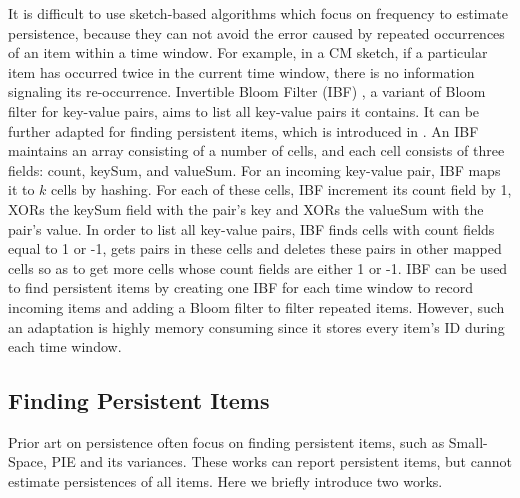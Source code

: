 It is difficult to use sketch-based algorithms which focus on frequency to estimate persistence, because they can not avoid the error caused by repeated occurrences of an item within a time window.
For example, in a CM sketch, if a particular item has occurred twice in the current time window, there is no information signaling its re-occurrence.
Invertible Bloom Filter (IBF) \cite{IBF}, a variant of Bloom filter for key-value pairs, aims to list all key-value pairs it contains.
It can be further adapted for finding persistent items, which is introduced in \cite{pie}.
An IBF maintains an array consisting of a number of cells, and each cell consists of three fields: count, keySum, and valueSum.
For an incoming key-value pair, IBF maps it to $k$ cells by hashing.
For each of these cells, IBF increment its count field by 1, XORs the keySum field with the pair's key and XORs the valueSum with the pair's value.
In order to list all key-value pairs, IBF finds cells with count fields equal to 1 or -1, gets pairs in these cells and deletes these pairs in other mapped cells so as to get more cells whose count fields are either 1 or -1.
IBF can be used to find persistent items by creating one IBF for each time window to record incoming items and adding a Bloom filter to filter repeated items.
However, such an adaptation is highly memory consuming since it stores every item's ID during each time window.





\presub
\subsection{Finding Persistent Items}
\postsub
\label{subsec:relate:persis}

Prior art on persistence often focus on finding persistent items, such as  Small-Space\cite{smallspace}, PIE\cite{pie} and its variances\cite{DISPERSE}.
These works can report persistent items, but cannot estimate persistences of all items.
Here we briefly introduce two works.


